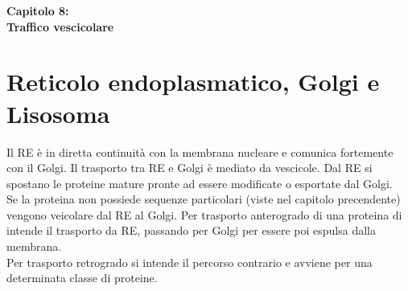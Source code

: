\Huge\textbf{Capitolo 8: \\Traffico vescicolare}\\

\small
\section{Reticolo endoplasmatico, Golgi e Lisosoma}
    Il RE è in diretta continuità con la membrana nucleare e comunica fortemente con il Golgi. Il trasporto tra RE e Golgi è mediato da vescicole. Dal RE si spostano le proteine mature pronte ad essere modificate o esportate dal Golgi.\\
    Se la proteina non possiede sequenze particolari (viste nel capitolo precendente) vengono veicolare dal RE al Golgi.
    Per trasporto anterogrado di una proteina di intende il trasporto da RE, passando per Golgi per essere poi espulsa dalla membrana.\\
    Per trasporto retrogrado si intende il percorso contrario e avviene per una determinata classe di proteine.
    
